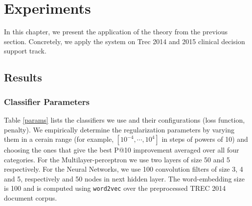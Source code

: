 \chapter{Experiments}

In this chapter, we present the application of the theory from the previous section. Concretely, we apply the system on Trec 2014 and 2015
clinical decision support track. 

\section{Results}
\subsection{Classifier Parameters}
Table \ref{params} lists the classifiers we use and their configurations (loss function, penalty). We empirically determine
the regularization
parameters by varying them in a cerain range (for example, $[10^{-4},\cdots,10^4]$ in steps of powers of 10) and choosing the ones
that give the
best P@10 improvement averaged over all four categories.
For the Multilayer-perceptron we use two layers of size 50 and 5 respectively. For the Neural Networks,
we use 100 convolution filters of size 3, 4 and 5, respectively and 50 nodes in next hidden layer. The word-embedding size is 100 
and is computed using \texttt{word2vec} over the preprocessed TREC 2014 document corpus.


